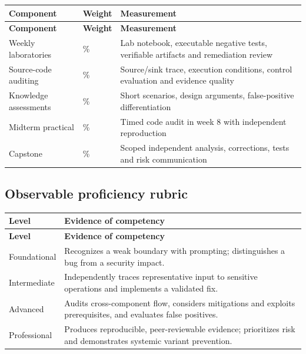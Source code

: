 \documentclass[10pt,letterpaper]{article}
\begin{document}
\begingroup\footnotesize\setlength\tabcolsep{3pt}
\begin{longtable}{>{\raggedright\arraybackslash}p{}>{\raggedright\arraybackslash}p{}>{\raggedright\arraybackslash}p{}}\toprule
\textbf{Component} & \textbf{Weight} & \textbf{Measurement}\\\midrule\endfirsthead
\toprule \textbf{Component} & \textbf{Weight} & \textbf{Measurement}\\\midrule\endhead
Weekly laboratories & 30\% & Lab notebook, executable negative tests, verifiable artifacts and remediation review\\\midrule
Source-code auditing & 20\% & Source/sink trace, execution conditions, control evaluation and evidence quality\\\midrule
Knowledge assessments & 15\% & Short scenarios, design arguments, false-positive differentiation\\\midrule
Midterm practical & 10\% & Timed code audit in week 8 with independent reproduction\\\midrule
Capstone & 25\% & Scoped independent analysis, corrections, tests and risk communication\\\midrule
\bottomrule\end{longtable}\endgroup
\subsection{Observable proficiency rubric}
\begingroup\footnotesize\setlength\tabcolsep{3pt}
\begin{longtable}{>{\raggedright\arraybackslash}p{}>{\raggedright\arraybackslash}p{}}\toprule
\textbf{Level} & \textbf{Evidence of competency}\\\midrule\endfirsthead
\toprule \textbf{Level} & \textbf{Evidence of competency}\\\midrule\endhead
Foundational & Recognizes a weak boundary with prompting; distinguishes a bug from a security impact.\\\midrule
Intermediate & Independently traces representative input to sensitive operations and implements a validated fix.\\\midrule
Advanced & Audits cross-component flow, considers mitigations and exploits prerequisites, and evaluates false positives.\\\midrule
Professional & Produces reproducible, peer-reviewable evidence; prioritizes risk and demonstrates systemic variant prevention.\\\midrule
\bottomrule\end{longtable}\endgroup
\end{document}
